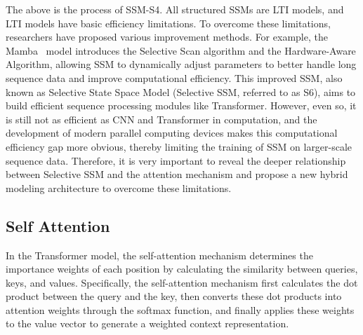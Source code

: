 \documentclass{article}
\theoremstyle{plain}
\theoremstyle{definition}
\theoremstyle{remark}
\begin{document}
The above is the process of SSM-S4. All structured SSMs are LTI models, and LTI models have basic efficiency limitations. To overcome these limitations, researchers have proposed various improvement methods. For example, the Mamba~\cite{mamba2} model introduces the Selective Scan algorithm and the Hardware-Aware Algorithm, allowing SSM to dynamically adjust parameters to better handle long sequence data and improve computational efficiency. This improved SSM, also known as Selective State Space Model (Selective SSM, referred to as S6), aims to build efficient sequence processing modules like Transformer. However, even so, it is still not as efficient as CNN and Transformer in computation, and the development of modern parallel computing devices makes this computational efficiency gap more obvious, thereby limiting the training of SSM on larger-scale sequence data. Therefore, it is very important to reveal the deeper relationship between Selective SSM and the attention mechanism and propose a new hybrid modeling architecture to overcome these limitations.

\subsection{Self Attention}
In the Transformer model, the self-attention mechanism determines the importance weights of each position by calculating the similarity between queries, keys, and values. Specifically, the self-attention mechanism first calculates the dot product between the query and the key, then converts these dot products into attention weights through the softmax function, and finally applies these weights to the value vector to generate a weighted context representation.
\end{document}
